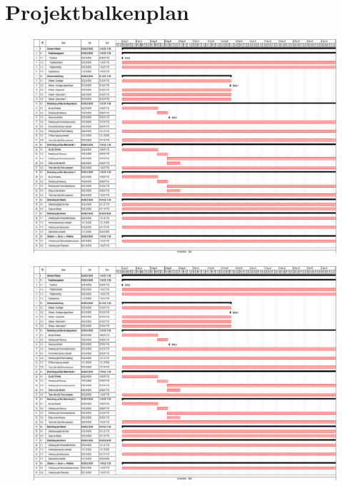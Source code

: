 \newpage

\section{Projektbalkenplan}

\begin{figure}[htbp]
    \centering
    \includegraphics[width=1.2\textwidth,page=1,angle=-90]{img/Projektbalkenplan-gantt_landscape.pdf}
    \label{fig:psp_balk}
\end{figure}
\begin{figure}[htbp]
    \centering
    \includegraphics[width=1.2\textwidth,page=2,angle=-90]{img/Projektbalkenplan-gantt_landscape.pdf}
    \label{fig:psp_balk2}
\end{figure}
\newpage

